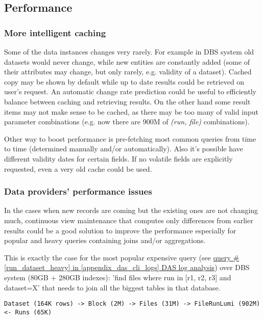 \subsection{Performance}



\subsubsection*{More intelligent caching}
Some of the data instances changes very rarely. For example in DBS system old datasets would never change, while new entities are constantly added (some of their attributes may change, but only rarely, e.g.  validity of a dataset). 
%
Cached copy may be shown by default while up to date results could be retrieved on user's request. An automatic change rate prediction could be useful to efficiently balance between caching and retrieving results.
%
On the other hand some result items may not make sense to be cached, as there may be too many of valid input parameter combinations (e.g. now there are 900M of \textit{(run, file)} combinations).

Other way to boost performance is pre-fetching most common queries from time to time (determined manually and/or automatically). Also it's possible have different validity dates for certain fields. If no volatile fields are explicitly requested, even a very old cache could be used.

\subsubsection*{Data providers' performance issues}
In the cases when new records are coming but the existing ones are not changing much, continuous view maintenance that computes only differences from earlier results could be a good solution to improve the performance especially for popular and heavy queries containing joins and/or aggregations. 

This is exactly the case for the most popular expensive query (see \hyperref[run_dataset_heavy]{query \#\ref{run_dataset_heavy} in \ref{appendix_das_cli_logs} DAS log analysis}) over DBS system (80GB + 280GB indexes): 'find files where run in [r1, r2, r3] and dataset=X' that needs to join all the biggest tables in that database.

\begin{verbatim}
Dataset (164K rows) -> Block (2M) -> Files (31M) -> FileRunLumi (902M) <- Runs (65K)
\end{verbatim}

